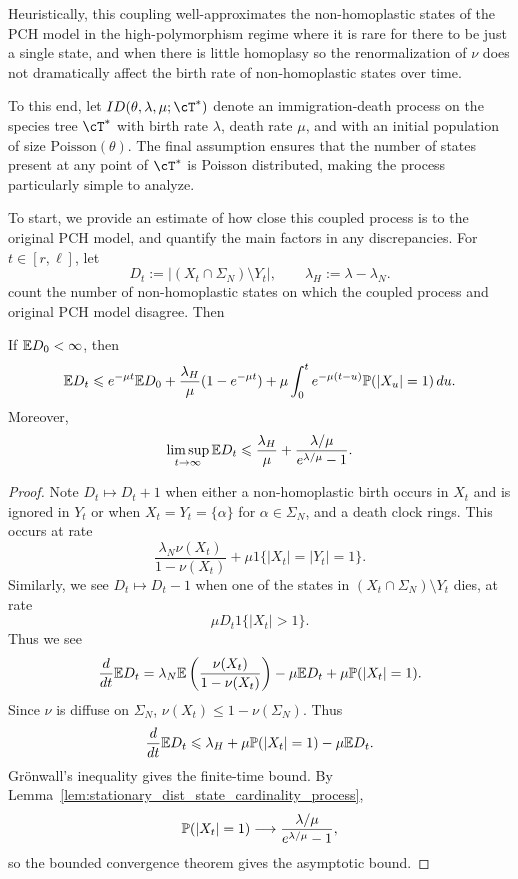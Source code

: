 Heuristically, this coupling well-approximates the non-homoplastic states of the PCH model in the
high-polymorphism regime where it is rare for there to be just a
single state, and when there is little homoplasy so the renormalization of
$\nu$ does not dramatically affect the birth rate of non-homoplastic states
over time.

To this end, let $ID(\theta, \lambda, \mu; \cT^*)$ denote an immigration-death process on the species tree $\cT^*$ with birth rate 
$\lambda$, death rate $\mu$, and with an initial population of size $\mathrm{Poisson}(\theta)$. The final assumption 
ensures that the number of states present at any point of $\cT^*$ is Poisson distributed, making the process particularly simple to analyze.

To start, we provide an estimate of how close this coupled process
is to the original PCH model, and quantify the main factors in any discrepancies.
For $t \in [r, \ell]$, let
%
\[
    D_t:=\left|(X_t\cap\Sigma_N)\setminus Y_t\right|,
    \qquad \lambda_H:=\lambda - \lambda_N.
\]
%
\noindent count the number of non-homoplastic states on which the coupled process and original PCH
model disagree. Then

\begin{proposition}
\label{prop:long_term_id_coupling_discrepancy} If $\E D_0 < \infty$, then 
%
\[
    \E D_t
    \leq e^{-\mu t}\E D_0
    +\frac{\lambda_H}{\mu}(1-e^{-\mu t})
    +\mu\int_0^t e^{-\mu(t-u)}\P(|X_u|=1)\,du.
\]
%
Moreover,
%
\[
    \limsup_{t\to\infty}\E D_t
    \leq
    \frac{\lambda_H}{\mu}
    +\frac{\lambda/\mu}{e^{\lambda/\mu}-1}.
\]
%
\end{proposition}

\begin{proof}

Note $D_t \mapsto D_t + 1$ when either a non-homoplastic birth occurs in $X_t$ and is ignored in $Y_t$ 
or when $X_t = Y_t = \{\alpha\}$ for $\alpha \in \Sigma_N$, and a death clock rings. This occurs at rate
%
    \[\frac{\lambda_N \nu(X_t)}{1-\nu(X_t)} + \mu 1\{|X_t| = |Y_t| = 1\}.\]
%
\noindent Similarly, we see $D_t \mapsto D_t - 1$ when one of the states in $(X_t \cap \Sigma_N) \setminus Y_t$ dies,
at rate
%
    \[\mu D_t 1\{|X_t| > 1\}.\]
%
\noindent Thus we see
%
    \[\frac{d}{dt} \E D_t = \lambda_N \E \left(\frac{\nu(X_t)}{1-\nu(X_t)}\right) - \mu \E D_t + \mu \P(|X_t| = 1).\]
%
Since $\nu$ is diffuse on $\Sigma_N$, $\nu(X_t)\leq1-\nu(\Sigma_N)$. Thus
%
\[
    \frac{d}{dt}\E D_t
    \leq \lambda_H+\mu\P(|X_t|=1)-\mu\E D_t.
\]
%
Gr\"onwall's inequality gives the finite-time bound. By
Lemma~\ref{lem:stationary_dist_state_cardinality_process},
%
\[
    \P(|X_t|=1)\longrightarrow
    \frac{\lambda/\mu}{e^{\lambda/\mu}-1},
\]
%
so the bounded convergence theorem gives the asymptotic bound.
\end{proof}

